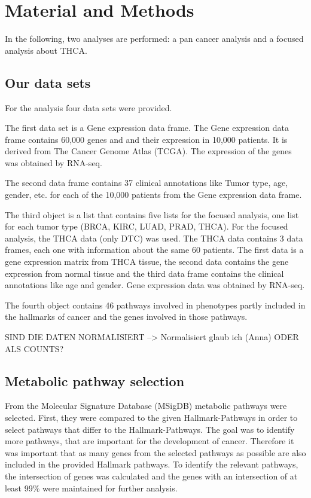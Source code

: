 \documentclass[
]{article}
\author{}
\date{\vspace{-2.5em}}
\begin{document}
\hypertarget{material-and-methods}{%
\section{Material and Methods}\label{material-and-methods}}

In the following, two analyses are performed: a pan cancer analysis and
a focused analysis about THCA.

\hypertarget{our-data-sets}{%
\subsection{Our data sets}\label{our-data-sets}}

For the analysis four data sets were provided.

The first data set is a Gene expression data frame. The Gene expression
data frame contains 60,000 genes and and their expression in 10,000
patients. It is derived from The Cancer Genome Atlas (TCGA). The
expression of the genes was obtained by RNA-seq.

The second data frame contains 37 clinical annotations like Tumor type,
age, gender, etc. for each of the 10,000 patients from the Gene
expression data frame.

The third object is a list that contains five lists for the focused
analysis, one list for each tumor type (BRCA, KIRC, LUAD, PRAD, THCA).
For the focused analysis, the THCA data (only DTC) was used. The THCA
data contains 3 data frames, each one with information about the same 60
patients. The first data is a gene expression matrix from THCA tissue,
the second data contains the gene expression from normal tissue and the
third data frame contains the clinical annotations like age and gender.
Gene expression data was obtained by RNA-seq.

The fourth object contains 46 pathways involved in phenotypes partly
included in the hallmarks of cancer and the genes involved in those
pathways.

SIND DIE DATEN NORMALISIERT --\textgreater{} Normalisiert glaub ich
(Anna) ODER ALS COUNTS?

\hypertarget{metabolic-pathway-selection}{%
\subsection{Metabolic pathway
selection}\label{metabolic-pathway-selection}}

From the Molecular Signature Database (MSigDB) \cite{xxx} metabolic
pathways were selected. First, they were compared to the given
Hallmark-Pathways in order to select pathways that differ to the
Hallmark-Pathways. The goal was to identify more pathways, that are
important for the development of cancer. Therefore it was important that
as many genes from the selected pathways as possible are also included
in the provided Hallmark pathways. To identify the relevant pathways,
the intersection of genes was calculated and the genes with an
intersection of at least 99\% were maintained for further analysis.
\end{document}
